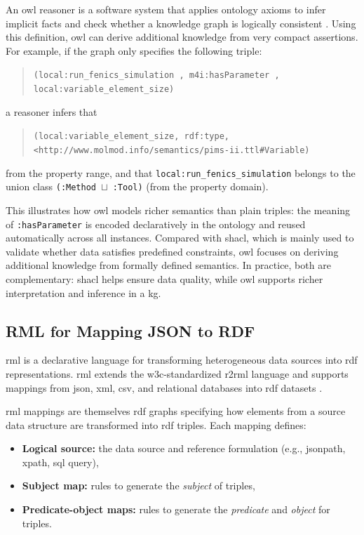 An \gls{owl} reasoner is a software system that applies ontology axioms to infer implicit facts and check whether a knowledge graph is logically consistent \cite{owl2_primer}. Using this definition, \gls{owl} can derive additional knowledge from very compact assertions. For example, if the graph only specifies the following triple:
\begin{quote}
\small
\texttt{(local:run\_fenics\_simulation , m4i:hasParameter , local:variable\_element\_size)}
\end{quote}
a reasoner infers that
\begin{quote}
\small  
\texttt{(local:variable\_element\_size, rdf:type, <http://www.molmod.info/semantics/pims-ii.ttl\#Variable)}
\end{quote}
from the property range, and that \texttt{local:run\_fenics\_simulation} belongs to the union class \texttt{(:Method $\sqcup$ :Tool)} (from the property domain).

This illustrates how \gls{owl} models richer semantics than plain triples: the meaning of \texttt{:hasParameter} is encoded declaratively in the ontology and reused automatically across all instances. Compared with \gls{shacl}, which is mainly used to validate whether data satisfies predefined constraints, \gls{owl} focuses on deriving additional knowledge from formally defined semantics. In practice, both are complementary: \gls{shacl} helps ensure data quality, while \gls{owl} supports richer interpretation and inference in a \gls{kg}.

\subsection{RML for Mapping JSON to RDF}
\label{sec:background:rml}

\gls{rml} is a declarative language for transforming heterogeneous data sources into \gls{rdf} representations. \gls{rml} extends the \gls{w3c}-standardized \gls{r2rml} language and supports mappings from \gls{json}, \gls{xml}, \gls{csv}, and relational databases into \gls{rdf} datasets \cite{dimou2014rml}.

\gls{rml} mappings are themselves \gls{rdf} graphs specifying how elements from a source data structure are transformed into \gls{rdf} triples. Each mapping defines:

\begin{itemize}
    \item \textbf{Logical source:} the data source and reference formulation (e.g., \gls{jsonpath}, \gls{xpath}, \gls{sql} query),
    \item \textbf{Subject map:} rules to generate the \emph{subject} of triples,
    \item \textbf{Predicate-object maps:} rules to generate the \emph{predicate} and \emph{object} for triples.
\end{itemize}


